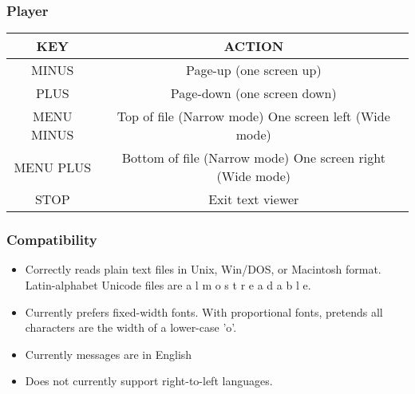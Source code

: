 \subsubsection{Player}

\begin{table}[h!]
\begin{tabular}{|c|c|}
\hline
KEY & ACTION \\\hline
MINUS & Page{}-up (one screen up) \\\hline
PLUS & Page{}-down (one screen down) \\\hline
MENU MINUS & Top of file (Narrow mode) One screen left (Wide mode) \\\hline
MENU PLUS & Bottom of file (Narrow mode) One screen right (Wide mode) \\\hline
STOP & Exit text viewer \\\hline
\end{tabular}
\end{table}

\subsubsection{Compatibility}

\begin{itemize}
\item Correctly reads plain text files in Unix, Win/DOS, or Macintosh
format. Latin{}-alphabet Unicode files are  a l m o s t  r e a d a b l
e.
\item Currently prefers fixed{}-width fonts. With proportional fonts,
pretends all characters are the width of a lower{}-case 'o'.
\item Currently messages are in English 
\item Does not currently support right{}-to{}-left languages.
\end{itemize}


